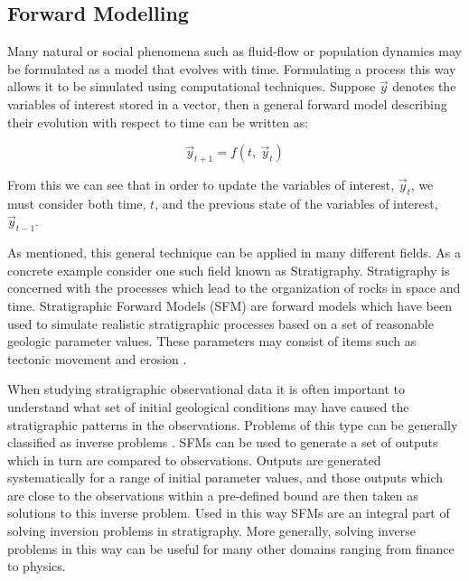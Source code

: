 \documentclass[12pt]{article}
\begin{document}
	\subsection{Forward Modelling}
	
	Many natural or social phenomena such as fluid-flow or population dynamics may be formulated as a model that evolves with time. Formulating a process this way allows it to be simulated using computational techniques. Suppose $\vec y$ denotes the variables of interest stored in a vector, then a general forward model describing their evolution with respect to time can be written as:
	
	\begin{center}
		\begin{equation}
		\vec y_{t+1} = f(t, ~\vec y_t)
		\end{equation}
	\end{center}
	
	From this we can see that in order to update the variables of interest, $\vec y_t$, we must consider both time, $t$, and the previous state of the variables of interest, $\vec y_{t-1}$.
	
	As mentioned, this general technique can be applied in many different fields. As a concrete example consider one such field known as Stratigraphy. Stratigraphy is concerned with the processes which lead to the organization of rocks in space and time. Stratigraphic Forward Models (SFM) are forward models which have been used to simulate realistic stratigraphic processes based on a set of reasonable geologic parameter values. These parameters may consist of items such as tectonic movement and erosion \autocite{10.2110/pec.99.62.0069}.
	
	When studying stratigraphic observational data it is often important to understand what set of initial geological conditions may have caused the stratigraphic patterns in the observations. Problems of this type can be generally classified as inverse problems \autocite{10.1260/0144598011492363}. SFMs can be used to generate a set of outputs which in turn are compared to observations. Outputs are generated systematically for a range of initial parameter values, and those outputs which are close to the observations within a pre-defined bound are then taken as solutions to this inverse problem. Used in this way SFMs are an integral part of solving inversion problems in stratigraphy. More generally, solving inverse problems in this way can be useful for many other domains ranging from finance to physics.
	
\end{document}
